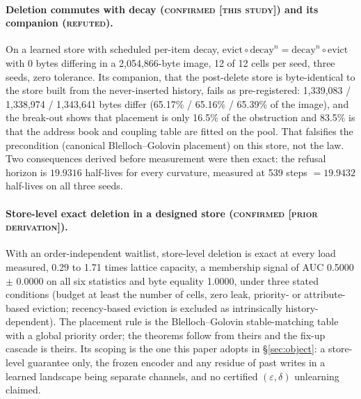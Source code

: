 \documentclass{article} %
\begin{document}
\paragraph{Deletion commutes with decay (\textsc{confirmed [this study]}) and its companion
(\textsc{refuted}).} On a learned store with scheduled per-item decay,
$\text{evict}\circ\text{decay}^n=\text{decay}^n\circ\text{evict}$ with 0 bytes differing in a
2,054,866-byte image, 12 of 12 cells per seed, three seeds, zero tolerance.
Its companion, that the post-delete store is byte-identical to the store built from the
never-inserted history, fails as pre-registered: 1,339,083 / 1,338,974 / 1,343,641 bytes differ
(65.17\% / 65.16\% / 65.39\% of the image), and the break-out shows that placement is only 16.5\%
of the obstruction and 83.5\% is that the address book and coupling table are fitted on the pool.
That falsifies the precondition (canonical Blelloch--Golovin placement) on this store, not the
law. Two consequences derived before measurement were then exact: the refusal horizon is $19.9316$
half-lives for every curvature, measured at 539 steps $=19.9432$ half-lives on all three seeds.

\paragraph{Store-level exact deletion in a designed store (\textsc{confirmed [prior
derivation]}).} With an order-independent waitlist, store-level deletion is exact at every load
measured, 0.29 to 1.71 times lattice capacity, a membership signal of AUC 0.5000 $\pm$ 0.0000 on all
six statistics and byte equality 1.0000, under three stated conditions (budget at least the number
of cells, zero leak, priority- or attribute-based eviction; recency-based eviction is excluded as
intrinsically history-dependent). %
The placement rule is the Blelloch--Golovin stable-matching table with a global priority order;
the theorems follow from theirs and the fix-up cascade is theirs. Its scoping is the one this
paper adopts in \S\ref{sec:object}: a store-level guarantee only, the frozen encoder and any
residue of past writes in a learned landscape being separate channels, and no certified
$(\varepsilon,\delta)$ unlearning claimed. %
\end{document}
